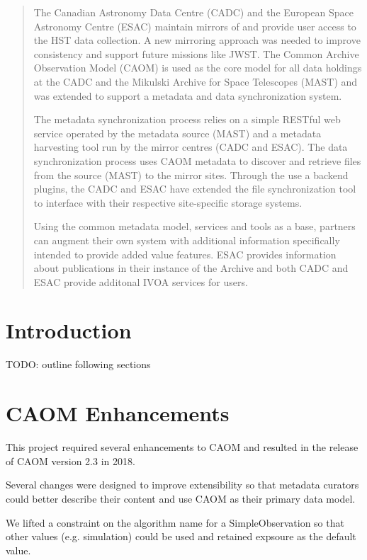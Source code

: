 \documentclass[11pt,twoside]{article}
\begin{document}
\begin{abstract}

The Canadian Astronomy Data Centre (CADC) and the European Space Astronomy Centre (ESAC) maintain mirrors of and provide user access to the HST data collection. A new mirroring approach was needed to improve consistency and support future missions like JWST. The Common Archive Observation Model (CAOM) is used as the core model for all data holdings at the CADC and the Mikulski Archive for Space Telescopes (MAST) and was extended to support a metadata and data synchronization system.

The metadata synchronization process relies on a simple RESTful web service operated by the metadata source (MAST) and a metadata harvesting tool run by the mirror centres (CADC and ESAC). The data synchronization process uses  CAOM metadata to discover and retrieve files from the source (MAST) to the mirror sites.  Through the use a backend plugins, the CADC and ESAC have extended the file synchronization tool to interface with their respective site-specific storage systems.

Using the common metadata model, services and tools as a base, partners can augment their own system with additional information specifically intended to provide added value features. ESAC provides information about publications in their instance of the Archive and both CADC and ESAC provide additonal IVOA services for users.
  
\end{abstract}

\section{Introduction}

TODO: outline following sections

\section{CAOM Enhancements}

This project required several enhancements to CAOM and resulted in the release of CAOM version 2.3 in 2018. 

Several changes were designed to improve extensibility so that metadata curators could better describe their content and use CAOM as their primary data model. 

We lifted a constraint on the algorithm name for a SimpleObservation so that other values (e.g. simulation) could be used and retained expsoure as the default value.
\end{document}
